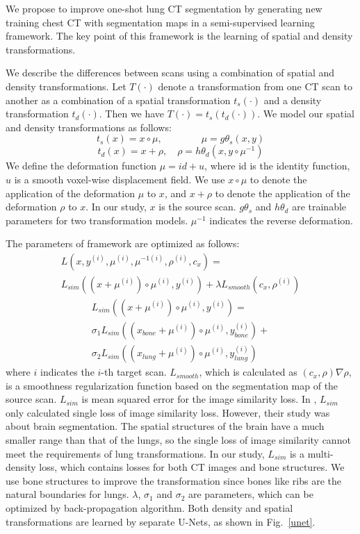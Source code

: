 \documentclass{article}
\def\L{{\cal L}}
\begin{document}
We propose to improve one-shot lung CT segmentation by generating new training chest CT with segmentation maps in a semi-supervised learning framework. The key point of this framework is the learning of spatial and density transformations.

We describe the differences between scans using a combination of spatial and density transformations. 
Let $T(\cdot)$ denote a transformation from one CT scan to another as a combination of a spatial transformation $t_s(\cdot)$ and a density transformation $t_d(\cdot)$. Then we have $T(\cdot)=t_s(t_d(\cdot))$. 
We model our spatial and density transformations as follows:
\begin{equation}
    t_s(x)=x\circ\mu,\qquad\qquad\mu=g\theta_s(x,y)
\end{equation}
\begin{equation}
    t_d(x)=x+\rho,\quad\rho=h\theta_d(x,y\circ\mu^{-1})
\end{equation}
We define the deformation function $\mu=id+u$, where id is the identity function, $u$ is a smooth voxel-wise displacement field. 
We use $x\circ\mu$ to denote the application of the deformation $\mu$ to $x$, and $x+\rho$ to denote the application of the deformation $\rho$ to $x$.
In our study, $x$ is the source scan. $g\theta_s$ and $h\theta_d$ are trainable parameters for two transformation models. $\mu^{-1}$ indicates the reverse deformation. 

The parameters of framework are optimized as follows:
\begin{align*}
    L(x,y^{(i)},\mu^{(i)},\mu^{-1(i)},\rho^{(i)},c_x)=\qquad\qquad\\L_{sim}((x+\mu^{(i)})\circ\mu^{(i)}, y^{(i)})+\lambda L_{smooth}(c_x,\rho^{(i)})
\end{align*}
\begin{align*}
    L_{sim}((x+\mu^{(i)})\circ\mu^{(i)}, y^{(i)})=\quad\\\sigma_1L_{sim}((x_{bone}+\mu^{(i)})\circ\mu^{(i)}, y_{bone}^{(i)})+\\\sigma_2L_{sim}((x_{lung}+\mu^{(i)})\circ\mu^{(i)}, y_{lung}^{(i)})
\end{align*}
where $i$ indicates the $i$-th target scan. $L_{smooth}$, which is calculated as $(c_x,\rho)\nabla\rho$, is a smoothness regularization function based on the segmentation map of the source scan.
$L_{sim}$ is mean squared error for the image similarity loss.
In \cite{zhao2019data}, $L_{sim}$ only calculated single loss of image similarity loss. However, their study was about brain segmentation. The spatial structures of the brain have a much smaller range than that of the lungs, so the single loss of image similarity cannot meet the requirements of lung transformations. In our study, $L_{sim}$ is a multi-density loss, which contains losses for both CT images and bone structures. We use bone structures to improve the transformation since bones like ribs are the natural boundaries for lungs. $\lambda$, $\sigma_1$ and $\sigma_2$ are parameters, which can be optimized by back-propagation algorithm.
Both density and spatial transformations are learned by separate U-Nets, as shown in Fig.~\ref{unet}.
\end{document}
